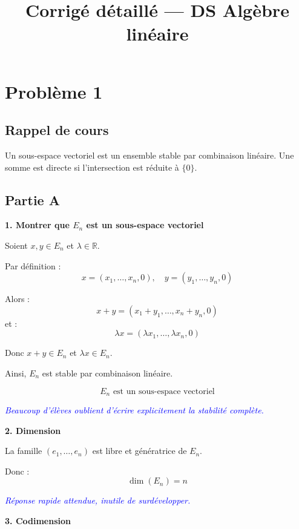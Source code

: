 \documentclass[11pt,a4paper]{article}
\title{Corrigé détaillé — DS Algèbre linéaire}
\date{}
\newcommand{\commentaire}[1]{\textcolor{blue}{\textit{#1}}}
\begin{document}
\maketitle

\section*{Problème 1}

\subsection*{Rappel de cours}

Un sous-espace vectoriel est un ensemble stable par combinaison linéaire.  
Une somme est directe si l’intersection est réduite à $\{0\}$.

\subsection*{Partie A}

\textbf{1. Montrer que $E_n$ est un sous-espace vectoriel}

Soient $x,y \in E_n$ et $\lambda \in \mathbb{R}$.

Par définition :
\[
x=(x_1,\dots,x_n,0), \quad y=(y_1,\dots,y_n,0)
\]

Alors :
\[
x+y=(x_1+y_1,\dots,x_n+y_n,0)
\]
et :
\[
\lambda x=(\lambda x_1,\dots,\lambda x_n,0)
\]

Donc $x+y \in E_n$ et $\lambda x \in E_n$.

Ainsi, $E_n$ est stable par combinaison linéaire.

\[
\boxed{E_n \text{ est un sous-espace vectoriel}}
\]

\commentaire{Beaucoup d’élèves oublient d’écrire explicitement la stabilité complète.}


\textbf{2. Dimension}

La famille $(e_1,\dots,e_n)$ est libre et génératrice de $E_n$.

Donc :
\[
\boxed{\dim(E_n)=n}
\]

\commentaire{Réponse rapide attendue, inutile de surdévelopper.}


\textbf{3. Codimension}
\end{document}

